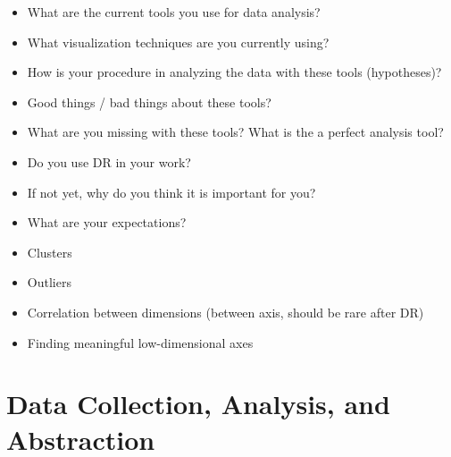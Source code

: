 
\begin{itemize}
    \item What are the current tools you use for data analysis?
    \item What visualization techniques are you currently using?
    \item How is your procedure in analyzing the data with these tools (hypotheses)?
    \item Good things / bad things about these tools?
    \item What are you missing with these tools? What is the a perfect analysis tool?
\end{itemize}


\begin{itemize} 
    \item Do you use \ac{DR} in your work?
    \item If not yet, why do you think it is important for you?
    \item What are your expectations?
\end{itemize}


\begin{itemize}
    \item Clusters
    \item Outliers
    \item Correlation between dimensions (between axis, should be rare after \ac{DR})
    \item Finding meaningful low-dimensional axes 
\end{itemize}


\section{Data Collection, Analysis, and Abstraction}
\label{app:drvistasks:methodology}


